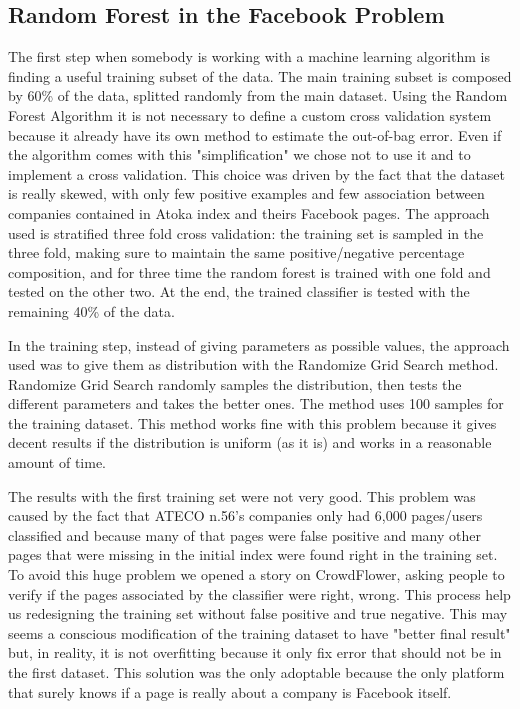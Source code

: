 
\subsection*{Random Forest in the Facebook Problem}

The first step when somebody is working with a machine learning algorithm is finding a useful training subset of the data. The main training subset is composed by 60\% of the data, splitted randomly from the main dataset.
Using the Random Forest Algorithm it is not necessary to define a custom cross validation system because it already have its own method to estimate the out-of-bag error. Even if the algorithm comes with this "simplification" we chose not to use it and to implement a cross validation. This choice was driven by the fact that the dataset is really skewed, with only few positive examples and few association between companies contained in Atoka index and theirs Facebook pages. The approach used is stratified three fold cross validation: the training set is sampled in the three fold, making sure to maintain the same positive/negative percentage composition, and for three time the random forest is trained with one fold and tested on the other two.
At the end, the trained classifier is tested with the remaining 40\% of the data.

In the training step, instead of giving parameters as possible values, the approach used was to give them as distribution with the Randomize Grid Search method. Randomize Grid Search randomly samples the distribution, then tests the different parameters and takes the better ones. The method uses 100 samples for the training dataset. This method works fine with this problem because it gives decent results if the distribution is uniform (as it is) and works in a reasonable amount of time.

The results with the first training set were not very good. This problem was caused by the fact that ATECO n.56's companies only had 6,000 pages/users classified and because many of that pages were false positive and many other pages that were missing in the initial index were found right in the training set.
To avoid this huge problem we opened a story on CrowdFlower\cite{crowdflw}, asking people to verify if the pages associated by the classifier were right, wrong. This process help us redesigning the training set without false positive and true negative. This may seems a conscious modification of the training dataset to have "better final result" but, in reality, it is not overfitting because it only fix error that should not be in the first dataset. This solution was the only adoptable because the only platform that surely knows if a page is really about a company is Facebook itself.

